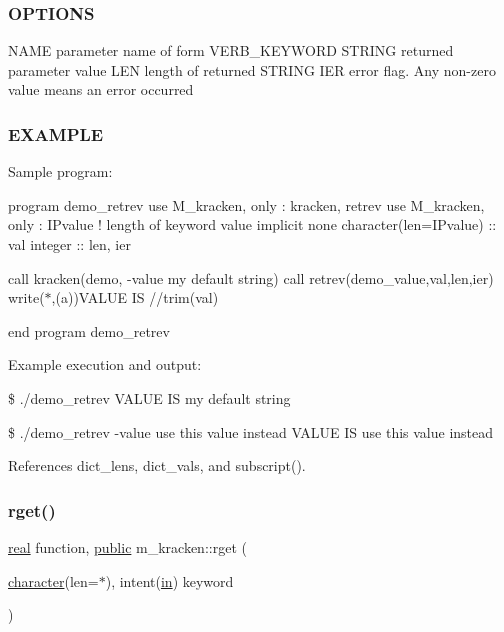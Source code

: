 \subsubsection*{O\+P\+T\+I\+O\+NS}

\begin{DoxyVerb} NAME    parameter name of form VERB_KEYWORD
 STRING  returned parameter value
 LEN     length of returned STRING
 IER     error flag. Any non-zero value means an error occurred
\end{DoxyVerb}


\subsubsection*{E\+X\+A\+M\+P\+LE}

Sample program\+:

program demo\+\_\+retrev use M\+\_\+kracken, only \+: kracken, retrev use M\+\_\+kracken, only \+: I\+Pvalue ! length of keyword value implicit none character(len=I\+Pvalue) \+:\+: val integer \+:\+: len, ier

call kracken(\textquotesingle{}demo\textquotesingle{}, \textquotesingle{} -\/value my default string\textquotesingle{}) call retrev(\textquotesingle{}demo\+\_\+value\textquotesingle{},val,len,ier) write($\ast$,\textquotesingle{}(a)\textquotesingle{})\textquotesingle{}V\+A\+L\+UE IS \textquotesingle{}//trim(val)

end program demo\+\_\+retrev

Example execution and output\+:

\$ ./demo\+\_\+retrev V\+A\+L\+UE IS my default string

\$ ./demo\+\_\+retrev -\/value use this value instead V\+A\+L\+UE IS use this value instead 

References dict\+\_\+lens, dict\+\_\+vals, and subscript().

\mbox{\label{namespacem__kracken_a21e0e40932af79430832a53bdb4de300}} 
\subsubsection{\texorpdfstring{rget()}{rget()}}
{\footnotesize\ttfamily \hyperlink{read__watch_83_8txt_abdb62bde002f38ef75f810d3a905a823}{real} function, \hyperlink{M__stopwatch_83_8txt_a2f74811300c361e53b430611a7d1769f}{public} m\+\_\+kracken\+::rget (\begin{DoxyParamCaption}\item[{\hyperlink{option__stopwatch_83_8txt_abd4b21fbbd175834027b5224bfe97e66}{character}(len=$\ast$), intent(\hyperlink{M__journal_83_8txt_afce72651d1eed785a2132bee863b2f38}{in})}]{keyword }\end{DoxyParamCaption})}



